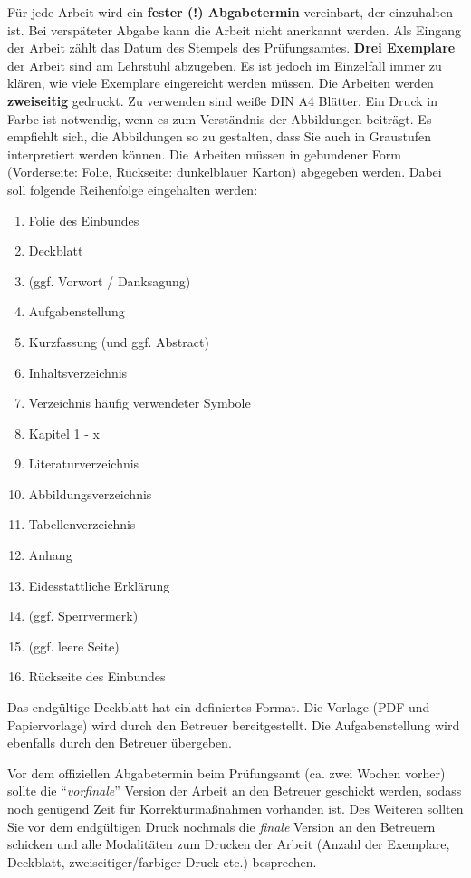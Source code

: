 Für jede Arbeit wird ein \textbf{fester (!) Abgabetermin} vereinbart, der einzuhalten ist.
Bei verspäteter Abgabe kann die Arbeit nicht anerkannt werden.
Als Eingang der Arbeit zählt das Datum des Stempels des Prüfungsamtes.
\textbf{Drei Exemplare} der Arbeit sind am Lehrstuhl abzugeben.
Es ist jedoch im Einzelfall immer zu klären, wie viele Exemplare eingereicht werden müssen.
Die Arbeiten werden \textbf{zweiseitig} gedruckt. Zu verwenden sind weiße DIN A4 Blätter.
Ein Druck in Farbe ist notwendig, wenn es zum Verständnis der Abbildungen beiträgt.
Es empfiehlt sich, die Abbildungen so zu gestalten, dass Sie auch in Graustufen interpretiert werden können.
Die Arbeiten müssen in gebundener Form (Vorderseite: Folie, Rückseite: dunkelblauer Karton) abgegeben werden.
Dabei soll folgende Reihenfolge eingehalten werden:
\begin{enumerate}
	\item Folie des Einbundes
	\item Deckblatt
	\item (ggf. Vorwort / Danksagung)
	\item Aufgabenstellung
	\item Kurzfassung (und ggf. Abstract)
	\item Inhaltsverzeichnis
	\item Verzeichnis häufig verwendeter Symbole
	\item Kapitel 1 - x
	\item Literaturverzeichnis
	\item Abbildungsverzeichnis
	\item Tabellenverzeichnis
	\item Anhang
	\item Eidesstattliche Erklärung
	\item (ggf. Sperrvermerk)
	\item (ggf. leere Seite)
	\item Rückseite des Einbundes
\end{enumerate}
Das endgültige Deckblatt hat ein definiertes Format. Die Vorlage (PDF und Papiervorlage) wird durch den Betreuer bereitgestellt. Die Aufgabenstellung wird ebenfalls durch den Betreuer übergeben.

Vor dem offiziellen Abgabetermin beim Prüfungsamt (ca. zwei Wochen vorher) sollte die "`\emph{vorfinale}"' Version der Arbeit an den Betreuer geschickt werden, sodass noch genügend Zeit für Korrekturmaßnahmen vorhanden ist.
Des Weiteren sollten Sie vor dem endgültigen Druck nochmals die \emph{finale} Version an den Betreuern schicken und alle Modalitäten zum Drucken der Arbeit (Anzahl der Exemplare, Deckblatt, zweiseitiger/farbiger Druck etc.) besprechen.

